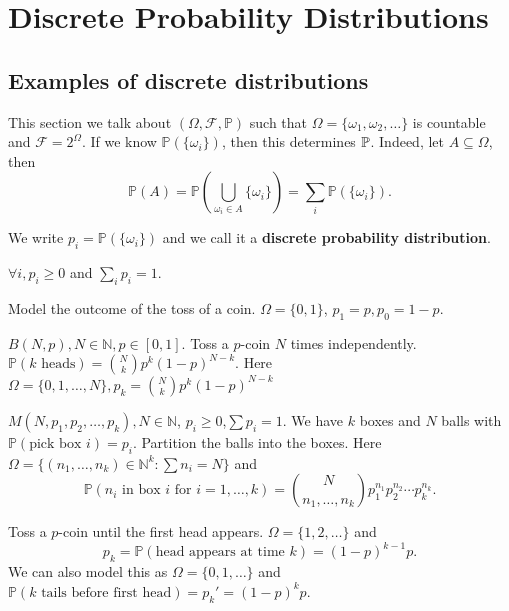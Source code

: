 \section{Discrete Probability Distributions}
\subsection{Examples of discrete distributions}
This section we talk about $ (\Omega,\mathscr{F},\mathbb{P}) $ such that $ \Omega=\{\omega_1,\omega_2,\dots\} $ is countable and $ \mathscr{F} = 2^{\Omega} $. If we know $ \mathbb{P}(\{\omega_i\}) $, then this determines ${\mathbb{P}}$. Indeed, let $ A \subseteq \Omega $, then
\[
    \mathbb{P}(A) = \mathbb{P}\left( \bigcup_{\omega_i\in A}\{\omega_i\} \right) = \sum_{i} \mathbb{P}(\{\omega_i\}).
\]
\begin{definition}
    We write $ p_i = \mathbb{P}(\{\omega_i\}) $ and we call it a \textbf{discrete probability distribution}.
\end{definition}
\begin{proposition}
    $ \forall i,p_i\ge 0 $ and $ \sum_i p_i=1 $.
\end{proposition}

\begin{example}
    Model the outcome of the toss of a coin. $ \Omega = \{0,1\} $, $ p_1=p,p_0=1-p $.
\end{example}

\begin{example}
    $ B(N,p),N\in \mathbb{N}, p\in [0,1] $. Toss a $p$-coin $N$ times independently. $ \mathbb{P}(k\text{ heads}) = \binom{N}{k}p^k(1-p)^{N-k} $. Here $ \Omega=\{0,1,\dots,N\},p_k=\binom{N}{k}p^k(1-p)^{N-k} $
\end{example}

\begin{example}
    $ M(N,p_1,p_2,\dots,p_k), N\in \mathbb{N}$, $p_i\ge 0$,$\sum p_i=1 $. We have $k$ boxes and $N$ balls with $ \mathbb{P}(\text{pick box }i)=p_i $. Partition the balls into the boxes. Here $ \Omega = \{(n_1,\dots,n_k)\in \mathbb{N}^k: \sum n_i=N\} $ and 
    \[
        \mathbb{P}(n_i \text{ in box }i \text{ for } i=1,\dots,k) = \binom{N}{n_1,\dots,n_k}p_1^{n_1}p_2^{n_2}\cdots p_k^{n_k}.
    \]
\end{example}

\begin{example}
    Toss a $p$-coin until the first head appears. $ \Omega=\{1,2,\dots\} $ and
    \[
        p_k=\mathbb{P}(\text{head appears at time }k)=(1-p)^{k-1}p.
    \]
    We can also model this as $ \Omega=\{0,1,\dots\} $ and $ \mathbb{P}(k \text{ tails before first head})=p_k'=(1-p)^{k}p $.
\end{example}

